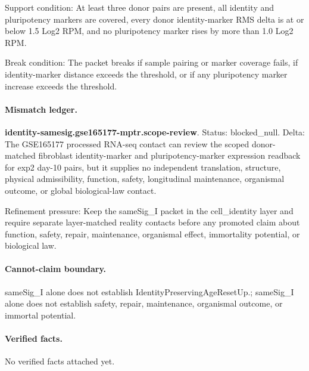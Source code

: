 Support condition: At least three donor pairs are present, all identity and pluripotency markers are covered, every donor identity-marker RMS delta is at or below 1.5 Log2 RPM, and no pluripotency marker rises by more than 1.0 Log2 RPM.

Break condition: The packet breaks if sample pairing or marker coverage fails, if identity-marker distance exceeds the threshold, or if any pluripotency marker increase exceeds the threshold.

\paragraph{Mismatch ledger.}
\textbf{identity-samesig.gse165177-mptr.scope-review}. Status: blocked\_null. Delta: The GSE165177 processed RNA-seq contact can review the scoped donor-matched fibroblast identity-marker and pluripotency-marker expression readback for exp2 day-10 pairs, but it supplies no independent translation, structure, physical admissibility, function, safety, longitudinal maintenance, organismal outcome, or global biological-law contact.

Refinement pressure: Keep the sameSig\_I packet in the cell\_identity layer and require separate layer-matched reality contacts before any promoted claim about function, safety, repair, maintenance, organismal effect, immortality potential, or biological law.

\paragraph{Cannot-claim boundary.} sameSig\_I alone does not establish IdentityPreservingAgeResetUp.; sameSig\_I alone does not establish safety, repair, maintenance, organismal outcome, or immortal potential.

\paragraph{Verified facts.}
No verified facts attached yet.
